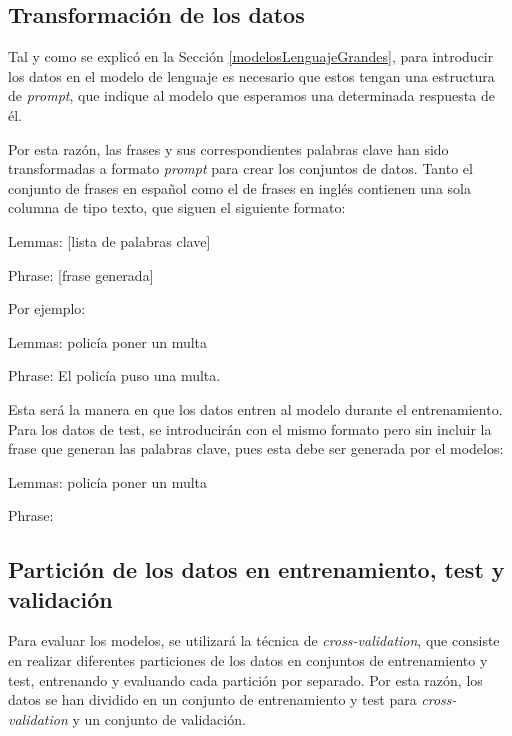 \documentclass[11pt,spanish,listoffigures,listoftables]{tfgetsinf}
\begin{document}
\subsection{Transformación de los datos}

Tal y como se explicó en la Sección \ref{modelosLenguajeGrandes}, para introducir los datos en el modelo de lenguaje es necesario que estos tengan una estructura de \textit{prompt}, que indique al modelo que esperamos una determinada respuesta de él.

Por esta razón, las frases y sus correspondientes palabras clave han sido transformadas a formato \textit{prompt} para crear los conjuntos de datos. Tanto el conjunto de frases en español como el de frases en inglés contienen una sola columna de tipo texto, que siguen el siguiente formato:

\begin{displayquote}
Lemmas: [lista de palabras clave]

Phrase: [frase generada]
\end{displayquote}

Por ejemplo:

\begin{displayquote}
Lemmas: policía poner un multa

Phrase: El policía puso una multa.
\end{displayquote}

Esta será la manera en que los datos entren al modelo durante el entrenamiento. Para los datos de test, se introducirán con el mismo formato pero sin incluir la frase que generan las palabras clave, pues esta debe ser generada por el modelos:

\begin{displayquote}
Lemmas: policía poner un multa

Phrase:
\end{displayquote}

\subsection{Partición de los datos en entrenamiento, test y validación}

Para evaluar los modelos, se utilizará la técnica de \textit{cross-validation}, que consiste en realizar diferentes particiones de los datos en conjuntos de entrenamiento y test, entrenando y evaluando cada partición por separado. Por esta razón, los datos se han dividido en un conjunto de entrenamiento y test para \textit{cross-validation} y un conjunto de validación.
\end{document}

